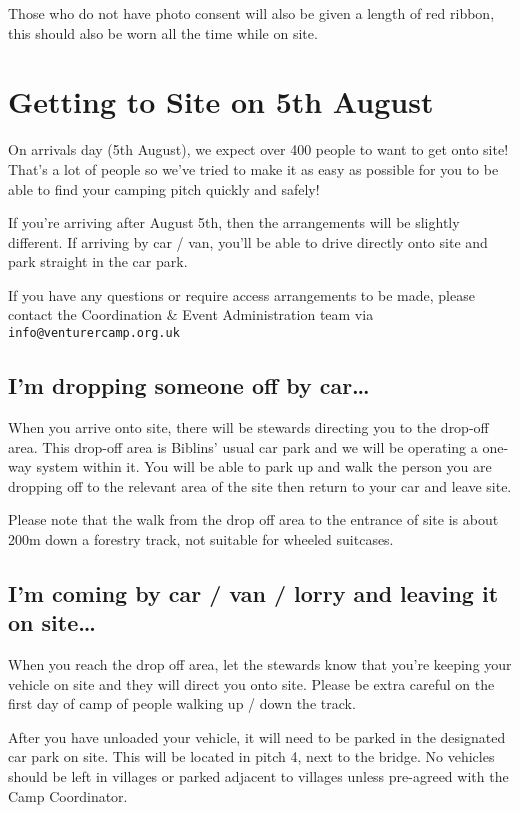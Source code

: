 \documentclass[a4paper, 11pt]{report}
\begin{document}
Those who do not have photo consent will also be given a length of red ribbon, this should also be worn all the time while on site. 
\section{Getting to Site on 5th August}
On arrivals day (5th August), we expect over 400 people to want to get onto site! That's a lot of people so we've tried to make it as easy as possible for you to be able to find your camping pitch quickly and safely!\nl

If you're arriving after August 5th, then the arrangements will be slightly different. If arriving by car / van, you'll be able to drive directly onto site and park straight in the car park.\nl

If you have any questions or require access arrangements to be made, please contact the Coordination \& Event Administration team via \texttt{info@venturercamp.org.uk}

\subsection{I'm dropping someone off by car\ldots}
When you arrive onto site, there will be stewards directing you to the drop-off area. This drop-off area is Biblins' usual car park and we will be operating a one-way system within it. You will be able to park up and walk the person you are dropping off to the relevant area of the site then return to your car and leave site.\nl

Please note that the walk from the drop off area to the entrance of site is about 200m down a forestry track, not suitable for wheeled suitcases.

\subsection{I'm coming by car / van / lorry and leaving it on site\ldots}
When you reach the drop off area, let the stewards know that you're keeping your vehicle on site and they will direct you onto site. Please be extra careful on the first day of camp of people walking up / down the track.\nl

After you have unloaded your vehicle, it will need to be parked in the designated car park on site. This will be located in pitch 4, next to the bridge. No vehicles should be left in villages or parked adjacent to villages unless pre-agreed with the Camp Coordinator.
\end{document}
